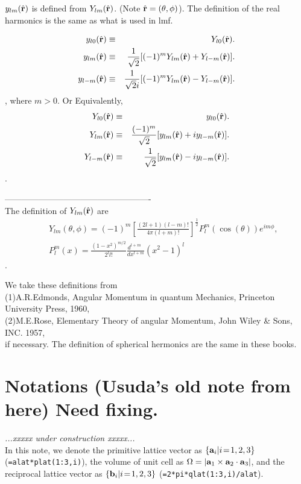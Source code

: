 \documentclass[a4paper,10pt,epsf,fleqn]{article}
\def\underconstruction{{\it...xxxxx under construction xxxxx...\\}}
\begin{document}
$y_{lm}(\hat{\bf r})$ is defined from $Y_{lm}(\hat{\bf r})$.
(Note $\hat{\bf r}=(\theta, \phi)$). The definition of the 
real harmonics is the same as what is used in lmf.

\begin{eqnarray}
 y_{l0}(\hat{\bf r}) 
  &\equiv& Y_{l0}(\hat{\bf r}). \\
 y_{lm}(\hat{\bf r}) 
  &\equiv& \frac{1}{\sqrt{2}}
           [ (-1)^m Y_{lm}(\hat{\bf r}) + Y_{l-m}(\hat{\bf r}) ]. \\
 y_{l-m}(\hat{\bf r})
  &\equiv& \frac{1}{\sqrt{2}i}
           [ (-1)^m Y_{lm}(\hat{\bf r}) - Y_{l-m}(\hat{\bf r}) ].
\end{eqnarray}
, where $m>0$. Or Equivalently,
\begin{eqnarray}
 Y_{l0}(\hat{\bf r}) 
  &\equiv& y_{l0}(\hat{\bf r}). \\
 Y_{lm}(\hat{\bf r}) 
  &\equiv& \frac{(-1)^m}{\sqrt{2}}
           [ y_{lm}(\hat{\bf r}) + iy_{l-m}(\hat{\bf r}) ]. \\
 Y_{l-m}(\hat{\bf r})
  &\equiv& \frac{1}{\sqrt{2}}
           [ y_{lm}(\hat{\bf r}) - iy_{l-m}(\hat{\bf r}) ].
\end{eqnarray}.

----------------------------------------------------\\
The definition of $Y_{lm}(\hat{\bf r})$ are
\begin{eqnarray}
&&Y_{lm}(\theta, \phi)
=(-1)^m \left[ \frac{(2l+1)(l-m)!}{4 \pi (l+m)!} \right]^{\frac{1}{2}} P^m_l(\cos(\theta)) e^{i m \phi}, \\
&&P^m_l(x) = \frac{(1-x^2)^{m/2}}{2^l l!}\frac{d^{l+m} \ \ }{dx^{l+m}} (x^2-1)^l
\end{eqnarray}.

\noindent We take these definitions from\\
(1)A.R.Edmonds, Angular Momentum in quantum Mechanics, 
Princeton University Press, 1960,\\
(2)M.E.Rose, Elementary Theory of angular Momentum,
John Wiley \& Sons, INC. 1957,\\
if necessary. The definition of spherical hermonics are the same in these books.


%








\section{Notations (Usuda's old note from here) Need fixing.}
\underconstruction
In this note, we denote the primitive lattice vector as
$\{{\bf a}_i| i\!=\!1,2,3\}$ (\verb#=alat*plat(1:3,i)#), 
the volume of unit cell as
$\Omega=|{\bf a}_1 \times {\bf a}_2 \cdot {\bf a}_3|$, and
the reciprocal lattice vector as $\{{\bf b}_i| i\!=\!1,2,3\}$
(\verb#=2*pi*qlat(1:3,i)/alat#).
\end{document}
